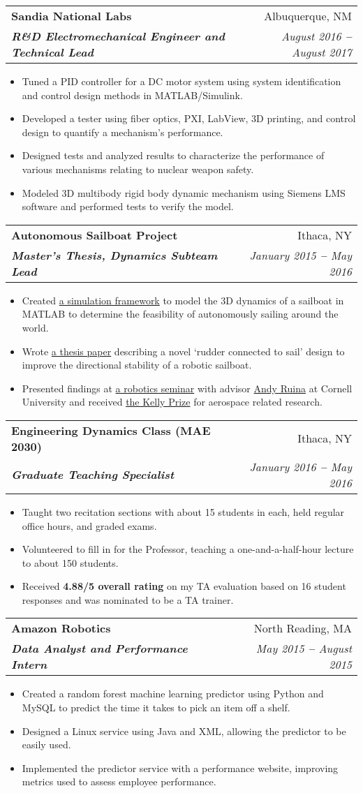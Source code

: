 \documentclass[letterpaper,11pt]{article}
\makeatletter
\newcommand{\resumeItem}[1]{
  \item\small{
    {#1}\vspace{-2pt}
  }
}
\newcommand{\resumeSubheading}[4]{
  \vspace{-2pt}\item
    \begin{tabular*}{1\textwidth}[t]{l@{\extracolsep{\fill}}r}
      \textbf{#1} & #2 \\
      \textit{\textbf{\small#3}} & \textit{\small #4} \\
    \end{tabular*}\vspace{-7pt}
}
\newcommand{\resumeItemListStart}{\begin{itemize}[leftmargin=15pt]}
\newcommand{\resumeItemListEnd}{\end{itemize}\vspace{-5pt}}
\makeatother
\begin{document}
\resumeSubheading
{Sandia National Labs}{Albuquerque, NM}
{R\&D Electromechanical Engineer and Technical Lead}{August 2016 \textbf{--} August 2017}
\resumeItemListStart
\resumeItem{Tuned a PID controller for a DC motor system using system identification and control design methods in MATLAB/Simulink.}
\resumeItem{Developed a tester using fiber optics, PXI, LabView, 3D printing, and control design to quantify a mechanism’s performance.}
\resumeItem{Designed tests and analyzed results to characterize the performance of various mechanisms relating to nuclear weapon safety.}
\resumeItem{Modeled 3D multibody rigid body dynamic mechanism using Siemens LMS software and performed tests to verify the model.}
\resumeItemListEnd

\resumeSubheading
{Autonomous Sailboat Project}{Ithaca, NY}
{Master’s Thesis, Dynamics Subteam Lead}{January 2015 \textbf{--} May 2016}
\resumeItemListStart
\resumeItem{Created \href{https://github.com/jam643/SailboatSim3D/tree/master}{\color{blue}a simulation framework} to model the 3D dynamics of a sailboat in MATLAB to determine the feasibility of autonomously sailing around the world.}
\resumeItem{Wrote \href{https://bpb-us-w2.wpmucdn.com/sites.coecis.cornell.edu/dist/5/91/files/2017/06/Semester-Report-Spring-2016-Jesse-Miller-1e485cb.pdf}{\color{blue}a thesis paper} describing a novel ‘rudder connected to sail’ design to improve the directional stability of a robotic sailboat.}
\resumeItem{Presented findings at \href{https://robotics.cornell.edu/2019/08/14/a-directionally-self-stable-robotic-sail-boat-concept-and-simulations/}{\color{blue}a robotics seminar} with advisor \href{http://ruina.tam.cornell.edu/}{\color{blue}Andy Ruina} at Cornell University and received \href{https://www.mae.cornell.edu/news/sibley-school-mechanical-aerospace-engineering-student-awards-0}{\color{blue}the Kelly Prize} for aerospace related research.}
\resumeItemListEnd

\resumeSubheading
{Engineering Dynamics Class (MAE 2030)}{Ithaca, NY}
{Graduate Teaching Specialist}{January 2016 \textbf{--} May 2016}
\resumeItemListStart
\resumeItem{Taught two recitation sections with about 15 students in each, held regular office hours, and graded exams.}
\resumeItem{Volunteered to fill in for the Professor, teaching a one-and-a-half-hour lecture to about 150 students.}
\resumeItem{Received \textbf{4.88/5 overall rating} on my TA evaluation based on 16 student responses and was nominated to be a TA trainer.}
\resumeItemListEnd

\resumeSubheading
{Amazon Robotics}{North Reading, MA}
{Data Analyst and Performance Intern}{May 2015 \textbf{--} August 2015}
\resumeItemListStart
\resumeItem{Created a random forest machine learning predictor using Python and MySQL to predict the time it takes to pick an item off a shelf.}
\resumeItem{Designed a Linux service using Java and XML, allowing the predictor to be easily used.}
\resumeItem{Implemented the predictor service with a performance website, improving metrics used to assess employee performance.}
\resumeItemListEnd
\end{document}
